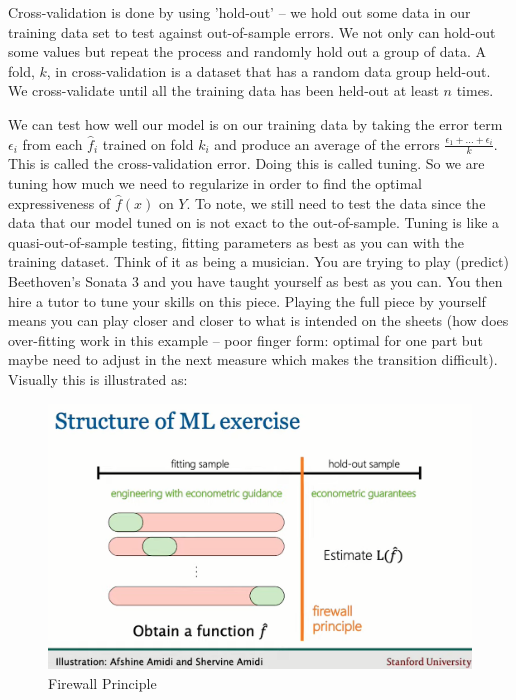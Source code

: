 \documentclass{article}
\begin{document}
Cross-validation is done by using 'hold-out' -- we hold out some data in our training data set to test against out-of-sample errors. We not only can hold-out some values but repeat the process and randomly hold out a group of data. A fold, $k$, in cross-validation is a dataset that has a random data group held-out. We cross-validate until all the training data has been held-out at least $n$ times. 

We can test how well our model is on our training data by taking the error term $\epsilon_i$ from each $\hat{f}_i$ trained on fold $k_i$ and produce an average of the errors $\frac{\epsilon_1 + ... + \epsilon_i}{k}$. This is called the cross-validation error. Doing this is called tuning. So we are tuning how much we need to regularize in order to find the optimal expressiveness of $\hat{f}(x)$ on $Y$. To note, we still need to test the data since the data that our model tuned on is not exact to the out-of-sample. Tuning is like a quasi-out-of-sample testing, fitting parameters as best as you can with the training dataset. Think of it as being a musician. You are trying to play (predict) Beethoven's Sonata 3 and you have taught yourself as best as you can. You then hire a tutor to tune your skills on this piece. Playing the full piece by yourself means you can play closer and closer to what is intended on the sheets (how does over-fitting work in this example -- poor finger form: optimal for one part but maybe need to adjust in the  next measure which makes the transition difficult). Visually this is illustrated as:

\begin{figure}[H]
    \centering
    \includegraphics[scale = 0.3]{firewall.png}
    \caption{Firewall Principle}
    \label{fig:fire}
\end{figure}
\end{document}
